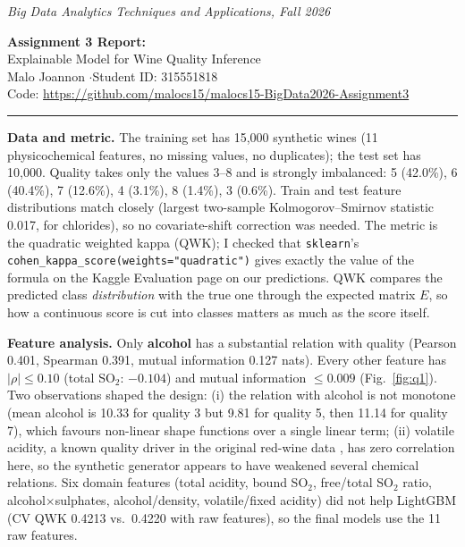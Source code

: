 \documentclass[10pt,a4paper]{article}
\newcommand{\question}[2]{\par\vspace{6pt}{\color{navy}\large\textbf{(10\%) Question #1:} #2}\par\vspace{2pt}}
\newcommand{\sub}[1]{\par\vspace{2pt}\textbf{\color{navy}#1}\quad}
\begin{document}
\begin{flushright}\textit{Big Data Analytics Techniques and Applications, Fall 2026}\end{flushright}
\vspace{-8pt}
\begin{center}
{\color{navy}\Large\textbf{Assignment 3 Report:}}\\[2pt]
{\color{navy}\Large Explainable Model for Wine Quality Inference}\\[4pt]
Malo Joannon \quad$\cdot$\quad Student ID: 315551818\\[1pt] Code: \url{https://github.com/malocs15/malocs15-BigData2026-Assignment3}
\end{center}
\vspace{-6pt}\noindent\rule{\textwidth}{0.4pt}

\question{1}{Preliminary Analysis.}

\sub{Data and metric.} The training set has 15{,}000 synthetic wines (11 physicochemical features, no missing values, no duplicates); the test set has 10{,}000. Quality takes only the values 3--8 and is strongly imbalanced: 5 (42.0\%), 6 (40.4\%), 7 (12.6\%), 4 (3.1\%), 8 (1.4\%), 3 (0.6\%). Train and test feature distributions match closely (largest two-sample Kolmogorov--Smirnov statistic 0.017, for chlorides), so no covariate-shift correction was needed. The metric is the quadratic weighted kappa (QWK); I checked that \texttt{sklearn}'s \texttt{cohen\_kappa\_score(weights="quadratic")} gives exactly the value of the formula on the Kaggle Evaluation page on our predictions. QWK compares the predicted class \emph{distribution} with the true one through the expected matrix $E$, so how a continuous score is cut into classes matters as much as the score itself.

\sub{Feature analysis.} Only \textbf{alcohol} has a substantial relation with quality (Pearson 0.401, Spearman 0.391, mutual information 0.127 nats). Every other feature has $|\rho|\le0.10$ (total SO$_2$: $-0.104$) and mutual information $\le0.009$ (Fig.~\ref{fig:q1}). Two observations shaped the design: (i) the relation with alcohol is not monotone (mean alcohol is 10.33 for quality 3 but 9.81 for quality 5, then 11.14 for quality 7), which favours non-linear shape functions over a single linear term; (ii) volatile acidity, a known quality driver in the original red-wine data \cite{cortez}, has zero correlation here, so the synthetic generator appears to have weakened several chemical relations. Six domain features (total acidity, bound SO$_2$, free/total SO$_2$ ratio, alcohol$\times$sulphates, alcohol/density, volatile/fixed acidity) did not help LightGBM (CV QWK 0.4213 vs.\ 0.4220 with raw features), so the final models use the 11 raw features.
\end{document}

